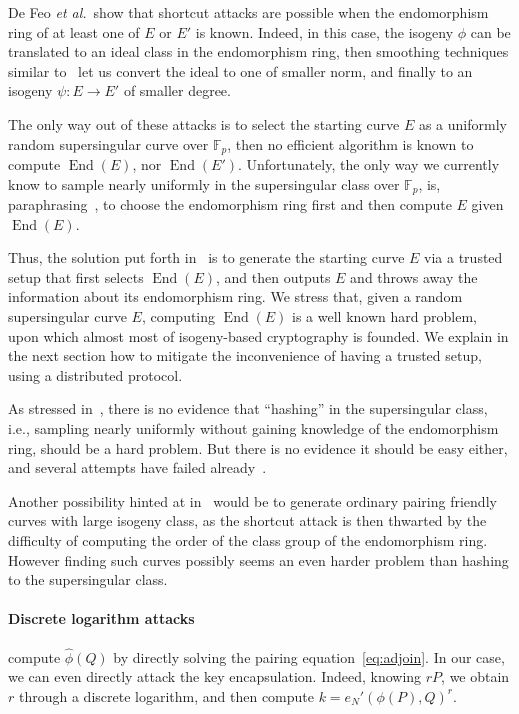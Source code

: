 \documentclass{llncs}
\newcommand{\F}{\mathbb{F}}
\DeclareMathOperator{\End}{End}
\begin{document}
De Feo \emph{et al.}\ show that shortcut attacks are possible when the
endomorphism ring of at least one of $E$ or $E'$ is known. %
Indeed, in this case, the isogeny $\phi$ can be translated to an ideal
class in the endomorphism ring, then smoothing techniques similar
to~\cite{kohel2014quaternion} let us convert the ideal to one of
smaller norm, and finally to an isogeny $\psi:E\to E'$ of smaller
degree.

The only way out of these attacks is to select the starting curve $E$
as a uniformly random supersingular curve over $\F_p$, then no
efficient algorithm is known to compute $\End(E)$, nor $\End(E')$. %
Unfortunately, the only way we currently know to sample nearly
uniformly in the supersingular class over $\F_p$, is,
paraphrasing~\cite{galbraith2018computational}, to choose the
endomorphism ring first and then compute $E$ given $\End(E)$.

Thus, the solution put forth in~\cite{10.1007/978-3-030-34578-5_10} is
to generate the starting curve $E$ via a trusted setup that first
selects $\End(E)$, and then outputs $E$ and throws away the
information about its endomorphism ring. %
We stress that, given a random supersingular curve $E$, computing
$\End(E)$ is a well known hard problem, upon which almost most of
isogeny-based cryptography is founded. %
We explain in the next section how to mitigate the inconvenience of
having a trusted setup, using a distributed protocol.

As stressed in~\cite{10.1007/978-3-030-34578-5_10}, there is no
evidence that ``hashing'' in the supersingular class, i.e., sampling
nearly uniformly without gaining knowledge of the endomorphism ring,
should be a hard problem. %
But there is no evidence it should be easy either, and several
attempts have failed
already~\cite{10.1007/978-3-030-45724-2_18,love2020supersingular}.

Another possibility hinted at in~\cite{10.1007/978-3-030-34578-5_10}
would be to generate ordinary pairing friendly curves with large
isogeny class, as the shortcut attack is then thwarted by the
difficulty of computing the order of the class group of the
endomorphism ring. %
However finding such curves possibly seems an even harder problem than
hashing to the supersingular class.

\paragraph{Discrete logarithm attacks} compute $\hat\phi(Q)$ by
directly solving the pairing equation~\eqref{eq:adjoin}. %
In our case, we can even directly attack the key encapsulation. %
Indeed, knowing $rP$, we obtain $r$ through a discrete logarithm, and
then compute $k=e_N'(\phi(P),Q)^r$.
\end{document}
